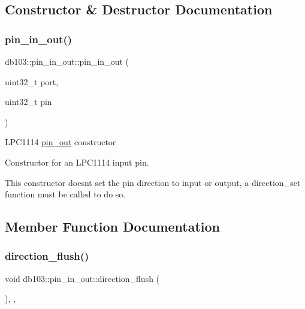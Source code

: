 \subsection{Constructor \& Destructor Documentation}
\mbox{\label{classdb103_1_1pin__in__out_a0cffb6f1eb4b215902f500c96c4866c4}} 
\subsubsection{\texorpdfstring{pin\+\_\+in\+\_\+out()}{pin\_in\_out()}}
{\footnotesize\ttfamily db103\+::pin\+\_\+in\+\_\+out\+::pin\+\_\+in\+\_\+out (\begin{DoxyParamCaption}\item[{uint32\+\_\+t}]{port,  }\item[{uint32\+\_\+t}]{pin }\end{DoxyParamCaption})\hspace{0.3cm}{\ttfamily [inline]}}

L\+P\+C1114 \hyperlink{classdb103_1_1pin__out}{pin\+\_\+out} constructor

Constructor for an L\+P\+C1114 input pin.

This constructor doesn\textquotesingle{}t set the pin direction to input or output, a direction\+\_\+set function must be called to do so. 

\subsection{Member Function Documentation}
\mbox{\label{classdb103_1_1pin__in__out_a9ec40785c38b923a6c5270e4435ad876}} 
\subsubsection{\texorpdfstring{direction\+\_\+flush()}{direction\_flush()}}
{\footnotesize\ttfamily void db103\+::pin\+\_\+in\+\_\+out\+::direction\+\_\+flush (\begin{DoxyParamCaption}{ }\end{DoxyParamCaption})\hspace{0.3cm}{\ttfamily [inline]}, {\ttfamily [override]}, {\ttfamily [virtual]}}

